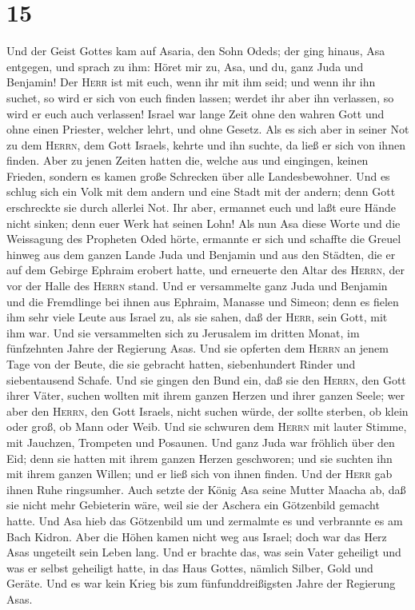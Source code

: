 \hypertarget{section-14}{%
\section{15}\label{section-14}}

 Und der Geist Gottes kam auf Asaria, den Sohn Odeds;
 der ging hinaus, Asa entgegen, und sprach zu ihm: Höret
mir zu, Asa, und du, ganz Juda und Benjamin! Der \textsc{Herr} ist mit
euch, wenn ihr mit ihm seid; und wenn ihr ihn suchet, so wird er sich
von euch finden lassen; werdet ihr aber ihn verlassen, so wird er euch
auch verlassen!  Israel war lange Zeit ohne den wahren
Gott und ohne einen Priester, welcher lehrt, und ohne Gesetz.
 Als es sich aber in seiner Not zu dem \textsc{Herrn}, dem
Gott Israels, kehrte und ihn suchte, da ließ er sich von ihnen finden.
 Aber zu jenen Zeiten hatten die, welche aus und
eingingen, keinen Frieden, sondern es kamen große Schrecken über alle
Landesbewohner.  Und es schlug sich ein Volk mit dem
andern und eine Stadt mit der andern; denn Gott erschreckte sie durch
allerlei Not.  Ihr aber, ermannet euch und laßt eure Hände
nicht sinken; denn euer Werk hat seinen Lohn!  Als nun Asa
diese Worte und die Weissagung des Propheten Oded hörte, ermannte er
sich und schaffte die Greuel hinweg aus dem ganzen Lande Juda und
Benjamin und aus den Städten, die er auf dem Gebirge Ephraim erobert
hatte, und erneuerte den Altar des \textsc{Herrn}, der vor der Halle des
\textsc{Herrn} stand.  Und er versammelte ganz Juda und
Benjamin und die Fremdlinge bei ihnen aus Ephraim, Manasse und Simeon;
denn es fielen ihm sehr viele Leute aus Israel zu, als sie sahen, daß
der \textsc{Herr}, sein Gott, mit ihm war.  Und sie
versammelten sich zu Jerusalem im dritten Monat, im fünfzehnten Jahre
der Regierung Asas.  Und sie opferten dem \textsc{Herrn}
an jenem Tage von der Beute, die sie gebracht hatten, siebenhundert
Rinder und siebentausend Schafe.  Und sie gingen den Bund
ein, daß sie den \textsc{Herrn}, den Gott ihrer Väter, suchen wollten
mit ihrem ganzen Herzen und ihrer ganzen Seele;  wer aber
den \textsc{Herrn}, den Gott Israels, nicht suchen würde, der sollte
sterben, ob klein oder groß, ob Mann oder Weib.  Und sie
schwuren dem \textsc{Herrn} mit lauter Stimme, mit Jauchzen, Trompeten
und Posaunen.  Und ganz Juda war fröhlich über den Eid;
denn sie hatten mit ihrem ganzen Herzen geschworen; und sie suchten ihn
mit ihrem ganzen Willen; und er ließ sich von ihnen finden. Und der
\textsc{Herr} gab ihnen Ruhe ringsumher.  Auch setzte der
König Asa seine Mutter Maacha ab, daß sie nicht mehr Gebieterin wäre,
weil sie der Aschera ein Götzenbild gemacht hatte. Und Asa hieb das
Götzenbild um und zermalmte es und verbrannte es am Bach Kidron.
 Aber die Höhen kamen nicht weg aus Israel; doch war das
Herz Asas ungeteilt sein Leben lang.  Und er brachte das,
was sein Vater geheiligt und was er selbst geheiligt hatte, in das Haus
Gottes, nämlich Silber, Gold und Geräte.  Und es war kein
Krieg bis zum fünfunddreißigsten Jahre der Regierung Asas.


